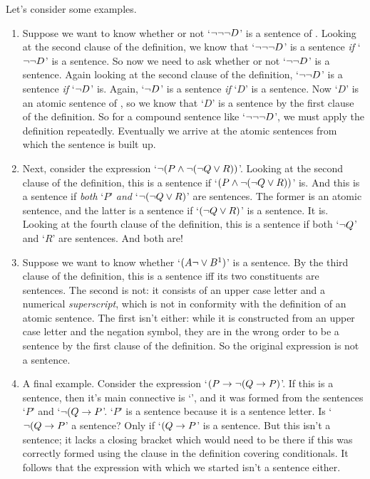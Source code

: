 Let's consider some examples.

\begin{enumerate}
	\item Suppose we want to know whether or not `$\neg \neg \neg D$' is a sentence of \TFL. Looking at the second clause of the definition, we know that `$\neg \neg \neg D$' is a sentence \emph{if} `$\neg \neg D$' is a sentence. So now we need to ask whether or not `$\neg \neg D$' is a sentence. Again looking at the second clause of the definition, `$\neg \neg D$' is a sentence \emph{if} `$\neg D$' is. Again, `$\neg D$' is a sentence \emph{if} `$D$' is a sentence. Now `$D$' is an atomic sentence of \TFL, so we know that `$D$' is a sentence by the first clause of the definition. So for a compound sentence like `$\neg \neg \neg D$', we must apply the definition repeatedly. Eventually we arrive at the atomic sentences from which the sentence is built up.
	\item Next, consider the expression `$\neg (P \wedge \neg (\neg Q \vee R))$'. Looking at the second clause of the definition, this is a sentence if `$(P \wedge \neg (\neg Q \vee R))$' is. And this is a sentence if \emph{both} `$P$' \emph{and} `$\neg (\neg Q \vee R)$' are sentences. The former is an atomic sentence, and the latter is a sentence if `$(\neg Q \vee R)$' is a sentence. It is. Looking at the fourth clause of the definition, this is a sentence if both `$\neg Q$' and `$R$' are sentences. And both are!
	\item Suppose we want to know whether `$(A\neg \vee B^{1})$' is a sentence. By the third clause of the definition, this is a sentence iff its two constituents are sentences. The second is not: it consists of an upper case letter and a numerical \emph{superscript}, which is not in conformity with the definition of an atomic sentence. The first isn't either: while it is constructed from an upper case letter and the negation symbol, they are in the wrong order to be a sentence by the first clause of the definition. So the original expression is not a sentence.
	\item A final example. Consider the expression `$(P \rightarrow \neg(Q \rightarrow P)$'. If this is a sentence, then it's main connective is `\eif', and it was formed from the sentences `$P$' and `$\neg(Q \rightarrow P$'. `$P$' is a sentence because it is a sentence letter. Is `$\neg(Q \rightarrow P$' a sentence? Only if `$(Q \rightarrow P$' is a sentence. But this isn't a sentence; it lacks a closing bracket which would need to be there if this was correctly formed using the clause in the definition covering conditionals. It follows that the expression with which we started isn't a sentence either.

\end{enumerate}

